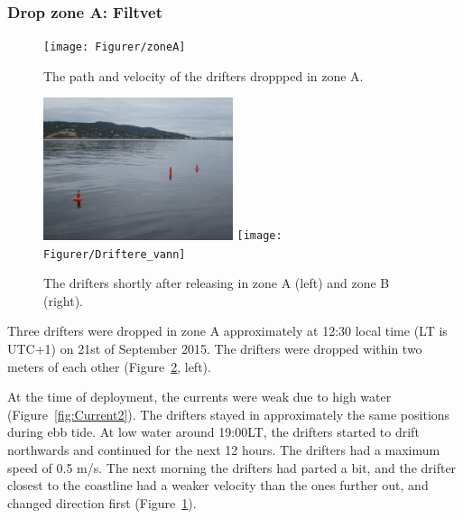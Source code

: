 \documentclass[12pt,a4paper,english]{article}
\begin{document}
\subsubsection{Drop zone A: Filtvet}
%
\begin{figure}[ht]
\centerline{
\texttt{[image: Figurer/zoneA]}}
\caption{\small
The path and velocity of the drifters droppped in zone A.%
}
\label{fig:ZoneA}
\end{figure}
%
%
\begin{figure}[ht]
\centerline{
\includegraphics*[width=0.495\textwidth]{Figurer/Driftere_vann2}
\texttt{[image: Figurer/Driftere\_vann]}
}
\caption{\small
The drifters shortly after releasing in zone A (left) and zone B (right).
}
\label{fig:DriftereVann}
\end{figure}

Three drifters were dropped in zone A approximately at 12:30 local time (LT is UTC+1) on 21st of September 2015. The drifters were dropped within two meters of each other (Figure~\ref{fig:DriftereVann}, left).

At the time of deployment, the currents were weak due to high water (Figure~\ref{fig:Current2}). The drifters stayed in approximately the same positions during ebb tide. At low water around 19:00LT, the drifters started to drift northwards and continued for the next 12 hours. The drifters had a maximum speed of 0.5 m/s. %
The next morning the drifters had parted a bit, and the drifter closest to the coastline had a weaker velocity than the ones further out, and changed direction first (Figure~\ref{fig:ZoneA}). 
\end{document}
